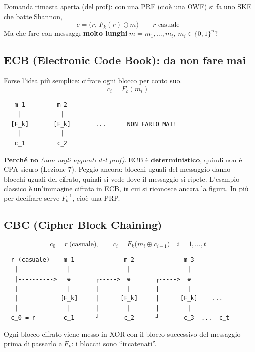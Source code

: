 Domanda rimasta aperta (del prof): con una PRF (cioè una OWF) si fa uno SKE che batte Shannon,
\[
c = \big(r,\ F_k(r) \oplus m\big) \qquad r \text{ casuale}
\]
Ma che fare con messaggi \textbf{molto lunghi} \(m = m_1, \dots, m_t\), \(m_i \in \{0,1\}^n\)?

\subsection{ECB (Electronic Code Book): da non fare mai}

Forse l'idea più semplice: cifrare ogni blocco per conto suo.
\[
c_i = F_k(m_i)
\]

\begin{verbatim}
   m_1         m_2
    |           |
  [F_k]       [F_k]       ...      NON FARLO MAI!
    |           |
   c_1         c_2
\end{verbatim}

\begin{nota}
\textbf{Perché no} \emph{(non negli appunti del prof)}: ECB è \textbf{deterministico}, quindi non è CPA-sicuro (Lezione 7). Peggio ancora: blocchi uguali del messaggio danno blocchi uguali del cifrato, quindi si vede dove il messaggio si ripete. L'esempio classico è un'immagine cifrata in ECB, in cui si riconosce ancora la figura. In più per decifrare serve \(F_k^{-1}\), cioè una PRP.
\end{nota}

\subsection{CBC (Cipher Block Chaining)}

\[
c_0 = r \ \text{(casuale)}, \qquad c_i = F_k\big(m_i \oplus c_{i-1}\big) \quad i = 1, \dots, t
\]

\begin{verbatim}
  r (casuale)    m_1              m_2              m_3
   |              |                |                |
   |---------->   ⊕       ┌----->  ⊕       ┌----->  ⊕
   |              |       |        |       |        |
   |            [F_k]     |      [F_k]     |      [F_k]    ...
   |              |       |        |       |        |
  c_0 = r        c_1 -----┘       c_2 -----┘       c_3  ...  c_t
\end{verbatim}

Ogni blocco cifrato viene messo in XOR con il blocco successivo del messaggio prima di passarlo a \(F_k\): i blocchi sono ``incatenati''.


